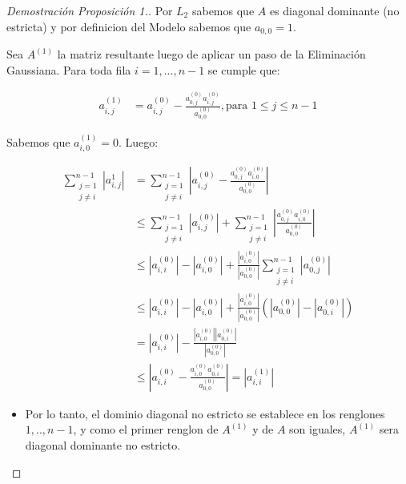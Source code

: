 \begin{proof}[Demostración Proposición 1.]

Por $L_{2}$ sabemos que $A$ es diagonal dominante (no estricta) y por definicion del Modelo sabemos que $a_{0,0} = 1$.

Sea $A^{(1)}$ la matriz resultante luego de aplicar un paso de la Eliminación Gaussiana. Para toda fila $i = 1,...,n-1$ se cumple que:

\begin{equation*}
    \begin{aligned}
      a^{(1)}_{i,j} &= a^{(0)}_{i,j} - \frac{a^{(0)}_{0,j}a^{(0)}_{i,j}}{a^{(0)}_{0,0}}, \text{para } 1 \leq j \leq n-1
    \end{aligned}
\end{equation*}

Sabemos que $a^{(1)}_{i,0} = 0$. Luego:

\begin{equation*}
    \begin{aligned}
      \sum\limits_{\substack{j=1  \\ j \neq i}}^{n-1} |a^{1}_{i,j}| &= \sum\limits_{\substack{j=1  \\ j \neq i}}^{n-1} |a^{(0)}_{i,j} - \frac{a^{(0)}_{0,j}a^{(0)}_{i,0}}{a^{(0)}_{0,0}}| \\
      &\leq \sum\limits_{\substack{j=1  \\ j \neq i}}^{n-1} |a^{(0)}_{i,j}| + \sum\limits_{\substack{j=1  \\ j \neq i}}^{n-1} |\frac{a^{(0)}_{0,j}a^{(0)}_{i,0}}{a^{(0)}_{0,0}}| \\
      &\leq |a^{(0)}_{i,i}| - |a^{(0)}_{i,0}| +  \frac{|a^{(0)}_{i,0}|}{|a^{(0)}_{0,0}|} \sum\limits_{\substack{j=1  \\ j \neq i}}^{n-1} |a^{(0)}_{0,j}| \\
      &\leq |a^{(0)}_{i,i}| - |a^{(0)}_{i,0}| +  \frac{|a^{(0)}_{i,0}|}{|a^{(0)}_{0,0}|} (|a^{(0)}_{0,0}| - |a^{(0)}_{0,i}|) \\
      &= |a^{(0)}_{i,i}| - \frac{|a^{(0)}_{i,0}||a^{(0)}_{0,i}|}{|a^{(0)}_{0,0}|} \\
      &\leq |a^{(0)}_{i,i} - \frac{a^{(0)}_{i,0}a^{(0)}_{0,i}}{a^{(0)}_{0,0}}| = |a^{(1)}_{i,i}|
    \end{aligned}
\end{equation*}

\begin{itemize}


\item Por lo tanto, el dominio diagonal no estricto se establece en los renglones $1,..,n-1$, y como el primer renglon de $A^{(1)}$ y de $A$ son iguales,
$A^{(1)}$ sera diagonal dominante no estricto.


\end{itemize}
\end{proof}
